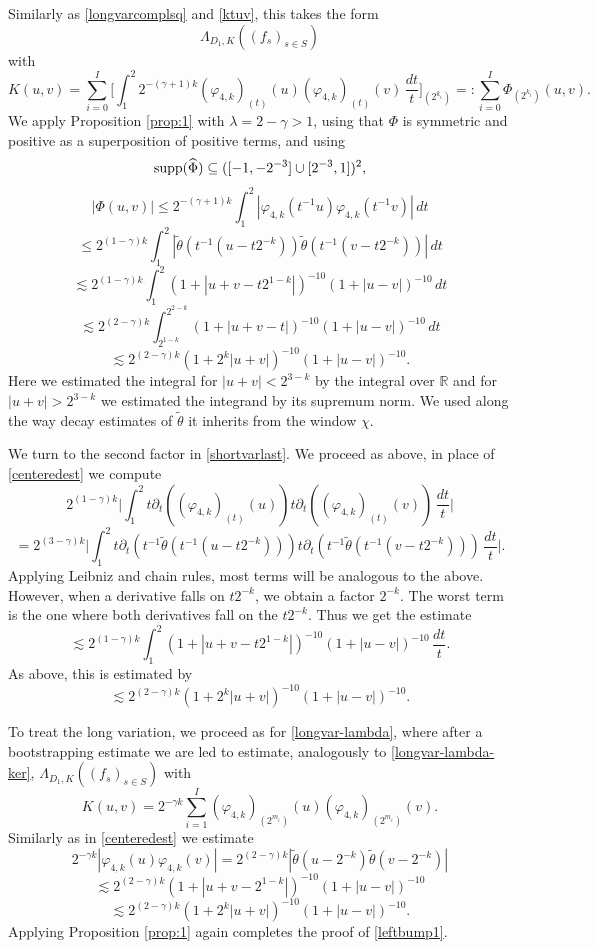 \documentclass[12pt,reqno]{amsart}
\theoremstyle{plain}
\theoremstyle{definition}
\numberwithin{equation}{section}
\newcommand{\R}{{\mathbb R}}
\begin{document}
Similarly as \eqref{longvarcomplsq} and \eqref{ktuv}, this takes the form
\[\Lambda_{D_1,K}((f_s)_{s\in S})\]
with 
\[K(u,v) =  \sum_{i=0}^I  \Big[ \int_1^2  2^{-(\gamma+1)k} (\varphi_{4,k})_{(t)} (u) (\varphi_{4,k})_{(t)} (v)  \,\frac{dt}{t}  \Big]_{(2^{k_i})} =: \sum_{i=0}^I \Phi_{(2^{k_i})}(u,v).\]
We apply Proposition \ref{prop:1} with $\lambda=2-\gamma>1$, using that $\Phi$ is symmetric and positive as a superposition of positive terms, and using 
\[\textup{supp}(\widehat{\Phi}) \subseteq ([-1,-2^{-3}]\cup [2^{-3},1])^2,\] 
\begin{equation}\label{centeredest}|\Phi(u,v)| \le 2^{-(\gamma+1)k}\int_1^2 |\varphi_{4,k}(t^{-1}u)\varphi_{4,k}(t^{-1}v)|\,{dt} 
\end{equation}
\[\leq 2^{(1-\gamma)k}\int_1^2|\widetilde{\theta}(t^{-1}(u-t2^{-k}))\widetilde{\theta}(t^{-1}(v-t2^{-k}))|\,dt\]
\[\lesssim  2^{(1-\gamma)k}\int_1^2
(1+|u+v-t2^{1-k}|)^{-10} (1+|u-v|)^{-10}
\,dt\]
\[\lesssim 2^{(2-\gamma)k}\int_{2^{1-k}}^{2^{2-k}}
(1+|u+v-t|)^{-10} (1+|u-v|)^{-10}
\,dt\]
\[\lesssim 2^{(2-\gamma)k}(1+2^k|u+v|)^{-10} (1+|u-v|)^{-10}.\]
Here we estimated the integral for
$|u+v|<2^{3-k}$ by the integral over $\R$
and for $|u+v|>2^{3-k}$ we estimated the integrand by
its supremum norm.
We used along the way decay estimates of   $\widetilde{\theta}$ 
it inherits from  the window $\chi$. 

 

We turn to the second factor in \eqref{shortvarlast}.
We  proceed as above, in place of \eqref{centeredest} we compute 
\[2^{(1-\gamma)k} \Big|\int_1^2 t\partial_t((\varphi_{4,k})_{(t)}(u))t\partial_{t}((\varphi_{4,k})_{(t)}(v)) \,\frac{dt}{t} \Big|  \]
\[=  2^{(3-\gamma)k}\Big|\int_1^2 t\partial_t(t^{-1}\widetilde{\theta}(t^{-1}(u-t2^{-k})))t\partial_t(t^{-1}\widetilde{\theta}(t^{-1}(v-t2^{-k})))\, \frac{dt}{t} \Big |. \]
Applying Leibniz and chain rules, most terms will be analogous to the above. However,
when a derivative falls on $t2^{-k}$, we obtain a factor $2^{-k}$. The worst term
is the one where both derivatives fall on the $t2^{-k}$. Thus we get the estimate
\[\lesssim 2^{(1-\gamma)k} \int_1^2 (1+|u+v-t2^{1-k}|)^{-10} (1+|u-v|)^{-10}\,\frac{dt}{t}.\]
As above, this is estimated by
\[\lesssim 2^{(2-\gamma)k}(1+2^k|u+v|)^{-10} (1+|u-v|)^{-10}.\]



To treat the long variation, we proceed as for \eqref{longvar-lambda}, where after a bootstrapping estimate we are led to estimate, analogously to \eqref{longvar-lambda-ker}, $\Lambda_{D_1,K}((f_s)_{s\in S})$ with
\[K(u,v) = 2^{-\gamma k}\sum_{i=1}^I(\varphi_{4,k})_{(2^{m_i})}(u)(\varphi_{4,k})_{(2^{m_i})}(v).\]
Similarly as in \eqref{centeredest} we estimate
 \[2^{-\gamma k}|\varphi_{4,k}(u)\varphi_{4,k}(v)| 
 = 2^{(2-\gamma)k} |\widetilde{\theta}(u-2^{-k})\widetilde{\theta}(v-2^{-k})|\]
\[\lesssim  2^{(2-\gamma)k}(1+|u+v-2^{1-k}|)^{-10} (1+|u-v|)^{-10} \]
\[\lesssim 2^{(2-\gamma)k}(1+2^k|u+v|)^{-10} (1+|u-v|)^{-10}.\]
Applying   Proposition \ref{prop:1}
again completes the proof of \eqref{leftbump1}. 
\end{document}
